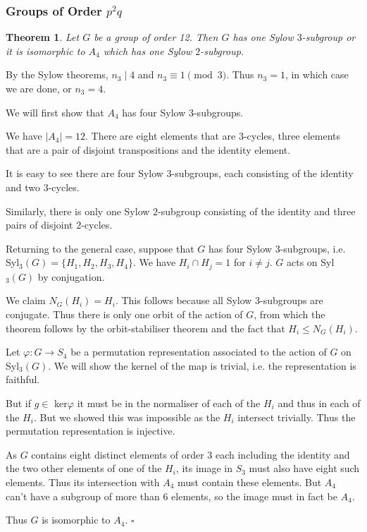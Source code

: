 \documentclass[10pt]{article}
\newtheorem{theorem}{Theorem}[section]
\newenvironment{proof}[1][Proof]{\begin{trivlist}
\item[\hskip \labelsep {\itshape #1}]}{\end{trivlist}}
\begin{document}
\subsubsection{Groups of Order $p^2q$}

\begin{theorem}
Let $G$ be a group of order 12. Then $G$ has one Sylow $3$-subgroup or it is isomorphic to $A_4$ which has one Sylow $2$-subgroup.
\end{theorem}

\begin{proof}
By the Sylow theorems, $n_3 \;|\; 4$ and $n_3 \equiv 1 \pmod{3}$. Thus $n_3 = 1$, in which case we are done, or $n_3 = 4$.

We will first show that $A_4$ has four Sylow $3$-subgroups.

We have $|A_4| = 12$. There are eight elements that are $3$-cycles, three elements that are a pair of disjoint transpositions and the identity element.

It is easy to see there are four Sylow $3$-subgroups, each consisting of the identity and two $3$-cycles.

Similarly, there is only one Sylow $2$-subgroup consisting of the identity and three pairs of disjoint $2$-cycles.

Returning to the general case, suppose that $G$ has four Sylow $3$-subgroups, i.e. Syl$_3(G) = \{H_1, H_2, H_3, H_4\}$. We have $H_i\cap H_j = 1$ for $i \neq j$. $G$ acts on Syl$_3(G)$ by conjugation.

We claim $N_G(H_i) = H_i$. This follows because all Sylow $3$-subgroups are conjugate. Thus there is only one orbit of the action of $G$, from which the theorem follows by the orbit-stabiliser theorem and the fact that $H_i \leq N_G(H_i)$.

Let $\varphi : G \to S_4$ be a permutation representation associated to the action of $G$ on Syl$_3(G)$. We will show the kernel of the map is trivial, i.e. the representation is faithful.

But if $g \in$ ker$\varphi$ it must be in the normaliser of each of the $H_i$ and thus in each of the $H_i$. But we showed this was impossible as the $H_i$ intersect trivially. Thus the permutation representation is injective.

As $G$ contains eight distinct elements of order $3$ each including the identity and the two other elements of one of the $H_i$, its image in $S_3$ must also have eight such elements. Thus its intersection with $A_4$ must contain these elements. But $A_4$ can't have a subgroup of more than $6$ elements, so the image must in fact be $A_4$.

Thus $G$ is isomorphic to $A_4$. $\square$
\end{proof}
\end{document}
